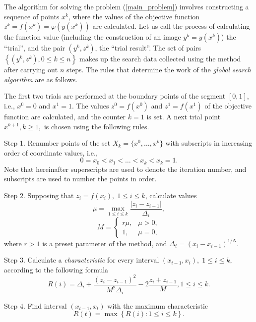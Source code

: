 \documentclass[sensors,article,submit,moreauthors,pdftex]{Definitions/mdpi}
\begin{document}
The algorithm for solving the problem (\ref{main_problem}) involves constructing a sequence of points $x^k$, where the values of the objective function $z^k = f(x^k)=\varphi(y(x^k))$ are calculated. Let us call the process of calculating the function value (including the construction of an image $y^k=y(x^k)$) the ``trial'', and the pair $(y^k, z^k)$, the ``trial result''. The set of pairs $\left\{(y^k, z^k), 0\leq k\leq n\right\}$ makes up the search data collected using the method after carrying out $n$ steps. The rules that determine the work of the \textit{global search algorithm} are as follows.

The first two trials are performed at the boundary points of the segment $[0,1]$, i.e., $x^0 = 0$ and $x^1 = 1$. The values $z^0 = f(x^0)$ and $z^1 = f(x^1)$ of the objective function are calculated, and the counter $k = 1$ is set. A next trial point $x^{k+1}, k \geq 1,$ is chosen using the following rules.

Step 1. Renumber points of the set $X_k=\{x^0,\dots,x^k\} $ with subscripts in increasing order of coordinate values, i.e.,
\[
0=x_0<x_1<\dots <x_k<x_{k}=1.
\]
Note that hereinafter superscripts are used to denote the iteration number, and subscripts are used to number the points in order.

Step 2. Supposing that  $z_i=f(x_i), \; 1\leq i \leq k$, calculate values 
\begin{equation}\label{mu}
\mu = \max_{1\leq i \leq k}\frac{\left|z_i-z_{i-1}\right|}{\Delta_i},
\end{equation}
\[
M = \left\{
   \begin{array}{lr}
     r\mu, & \mu > 0,\\
     1, & \mu = 0,
   \end{array}
\right.
 \]
where $r>1$ is a preset parameter of the method, and $\Delta_i=\left(x_i-x_{i-1}\right)^{1/N}$.

Step 3. Calculate a \textit{characteristic} for every interval $(x_{i-1}, x_i), \; 1\leq i \leq k,$   according to the following formula
\begin{equation}\label{R}
R(i)=\Delta_i+\frac{(z_i-z_{i-1})^2}{M^2\Delta_i}-2\frac{z_i+z_{i-1}}{M},1 \leq i \leq k.
\end{equation}

Step 4. Find interval $(x_{t-1},x_t)$ with the maximum characteristic
\begin{equation}\label{MaxR}
R(t)=\max{\left\{R(i): 1 \leq i \leq k \right\}}.
\end{equation}
\end{document}
